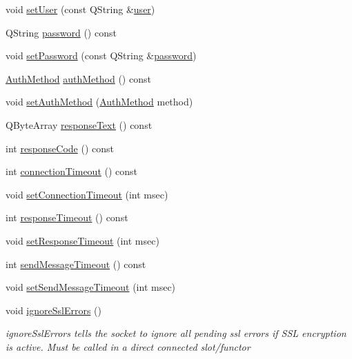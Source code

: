 \begin{DoxyCompactItemize}
\item 
void \hyperlink{class_simple_mail_1_1_sender_a20251be6b7b4064cd5f20ea224333c4c}{set\+User} (const Q\+String \&\hyperlink{class_simple_mail_1_1_sender_a70ce2ab650d894c40be88d82bd327c3b}{user})
\item 
Q\+String \hyperlink{class_simple_mail_1_1_sender_adc225693c32f66e746fec828a4da2bb6}{password} () const
\item 
void \hyperlink{class_simple_mail_1_1_sender_ae71f3d10ecc970e5c56ac01b1f05ff9b}{set\+Password} (const Q\+String \&\hyperlink{class_simple_mail_1_1_sender_adc225693c32f66e746fec828a4da2bb6}{password})
\item 
\hyperlink{class_simple_mail_1_1_sender_af50defb714bc3e95f47c71a9ba6ee6bb}{Auth\+Method} \hyperlink{class_simple_mail_1_1_sender_a94ae37e550e1afdadc351a0dcd4167c8}{auth\+Method} () const
\item 
void \hyperlink{class_simple_mail_1_1_sender_a60d13238dce6927d851273379d462fdd}{set\+Auth\+Method} (\hyperlink{class_simple_mail_1_1_sender_af50defb714bc3e95f47c71a9ba6ee6bb}{Auth\+Method} method)
\item 
Q\+Byte\+Array \hyperlink{class_simple_mail_1_1_sender_aefd7b3516fa828a73070fb73d1101d9d}{response\+Text} () const
\item 
int \hyperlink{class_simple_mail_1_1_sender_a5b5d8322553aa84e0166e3fecd43e4be}{response\+Code} () const
\item 
int \hyperlink{class_simple_mail_1_1_sender_a7d849aadcddaf812c9d1c4411c134381}{connection\+Timeout} () const
\item 
void \hyperlink{class_simple_mail_1_1_sender_aadabf1b2661b85a9b9865e5bd5d9b578}{set\+Connection\+Timeout} (int msec)
\item 
int \hyperlink{class_simple_mail_1_1_sender_a8a1e00cc48a9ac1106460f4bd856781d}{response\+Timeout} () const
\item 
void \hyperlink{class_simple_mail_1_1_sender_ae2463b653e04e3c9321517a2cb3342bf}{set\+Response\+Timeout} (int msec)
\item 
int \hyperlink{class_simple_mail_1_1_sender_a6e1308f5587c9c40c4609cccfb904423}{send\+Message\+Timeout} () const
\item 
void \hyperlink{class_simple_mail_1_1_sender_a6fa0ad623c4821205ab75bcfa6735998}{set\+Send\+Message\+Timeout} (int msec)
\item 
void \hyperlink{class_simple_mail_1_1_sender_a198c2a1fef662cd2323d05c1f5fa6adb}{ignore\+Ssl\+Errors} ()
\begin{DoxyCompactList}\small\item\em ignore\+Ssl\+Errors tells the socket to ignore all pending ssl errors if S\+SL encryption is active. Must be called in a direct connected slot/functor \end{DoxyCompactList}\item 

\end{DoxyCompactItemize}
